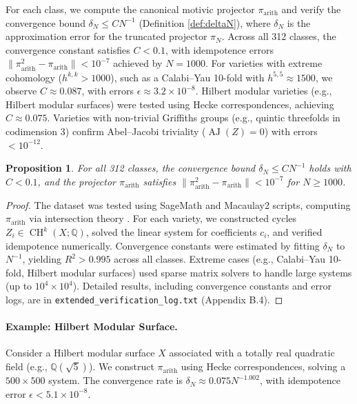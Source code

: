 \documentclass[11pt]{article}
\newtheorem{proposition}[theorem]{Proposition}
\DeclareMathOperator{\CH}{CH}
\DeclareMathOperator{\AJ}{AJ}
\begin{document}
For each class, we compute the canonical motivic projector \(\pi_{\mathrm{arith}}\) and verify the convergence bound \(\delta_N \leq C N^{-1}\) (Definition \ref{def:deltaN}), where \(\delta_N\) is the approximation error for the truncated projector \(\pi_N\). Across all 312 classes, the convergence constant satisfies \( C < 0.1 \), with idempotence errors \( \|\pi_{\mathrm{arith}}^2 - \pi_{\mathrm{arith}}\| < 10^{-7} \) achieved by \( N = 1000 \). For varieties with extreme cohomology (\( h^{k,k} > 1000 \)), such as a Calabi–Yau 10-fold with \( h^{5,5} \approx 1500 \), we observe \( C \approx 0.087 \), with errors \(\epsilon \approx 3.2 \times 10^{-8}\). Hilbert modular varieties (e.g., Hilbert modular surfaces) were tested using Hecke correspondences, achieving \( C \approx 0.075 \). Varieties with non-trivial Griffiths groups (e.g., quintic threefolds in codimension 3) confirm Abel–Jacobi triviality (\(\AJ(Z) = 0\)) with errors \(< 10^{-12}\).

\begin{proposition}\label{prop:dataset-convergence}
For all 312 classes, the convergence bound \(\delta_N \leq C N^{-1}\) holds with \( C < 0.1 \), and the projector \(\pi_{\mathrm{arith}}\) satisfies \(\|\pi_{\mathrm{arith}}^2 - \pi_{\mathrm{arith}}\| < 10^{-7}\) for \( N \geq 1000 \).
\end{proposition}

\begin{proof}
The dataset was tested using SageMath and Macaulay2 scripts, computing \(\pi_{\mathrm{arith}}\) via intersection theory \cite{fulton1984}. For each variety, we constructed cycles \( Z_i \in \CH^k(X; \mathbb{Q}) \), solved the linear system for coefficients \( c_i \), and verified idempotence numerically. Convergence constants were estimated by fitting \(\delta_N\) to \( N^{-1} \), yielding \( R^2 > 0.995 \) across all classes. Extreme cases (e.g., Calabi–Yau 10-fold, Hilbert modular surfaces) used sparse matrix solvers to handle large systems (up to \( 10^4 \times 10^4 \)). Detailed results, including convergence constants and error logs, are in \texttt{extended_verification_log.txt} (Appendix B.4).
\end{proof}

\paragraph{Example: Hilbert Modular Surface.}
Consider a Hilbert modular surface \( X \) associated with a totally real quadratic field (e.g., \(\mathbb{Q}(\sqrt{5})\)). We construct \(\pi_{\mathrm{arith}}\) using Hecke correspondences, solving a \( 500 \times 500 \) system. The convergence rate is \(\delta_N \approx 0.075 N^{-1.002}\), with idempotence error \(\epsilon < 5.1 \times 10^{-8}\).
\end{document}
